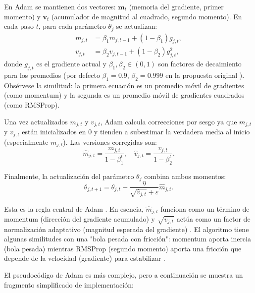 \documentclass[12pt, spanish]{article}
\begin{document}
En Adam se mantienen dos vectores: $\mathbf{m}_t$ (memoria del gradiente, primer momento) y $\mathbf{v}_t$ (acumulador de magnitud al cuadrado, segundo momento). En cada paso $t$, para cada parámetro $\theta_j$ se actualizan:
\begin{align*}
m_{j,t} &= \beta_1 m_{j,t-1} + (1 - \beta_1) g_{j,t}, \\
v_{j,t} &= \beta_2 v_{j,t-1} + (1 - \beta_2) g_{j,t}^2,
\end{align*}
donde $g_{j,t}$ es el gradiente actual y $\beta_1, \beta_2 \in (0,1)$ son factores de decaimiento para los promedios (por defecto $\beta_1 = 0.9$, $\beta_2 = 0.999$ en la propuesta original \cite{ref2}). Obsérvese la similitud: la primera ecuación es un promedio móvil de gradientes (como momentum) y la segunda es un promedio móvil de gradientes cuadrados (como RMSProp).

Una vez actualizados $m_{j,t}$ y $v_{j,t}$, Adam calcula correcciones por sesgo ya que $m_{j,t}$ y $v_{j,t}$ están inicializados en 0 y tienden a subestimar la verdadera media al inicio (especialmente $m_{j,t}$). Las versiones corregidas son:
\[
\hat{m}_{j,t} = \frac{m_{j,t}}{1 - \beta_1^t}, \quad \hat{v}_{j,t} = \frac{v_{j,t}}{1 - \beta_2^t}.
\]

Finalmente, la actualización del parámetro $\theta_j$ combina ambos momentos:
\[
\theta_{j,t+1} = \theta_{j,t} - \frac{\eta}{\sqrt{\hat{v}_{j,t}} + \varepsilon} \hat{m}_{j,t}.
\]

Esta es la regla central de Adam \cite{ref2}. En esencia, $\hat{m}_{j,t}$ funciona como un término de momentum (dirección del gradiente acumulado) y $\sqrt{\hat{v}_{j,t}}$ actúa como un factor de normalización adaptativo (magnitud esperada del gradiente) \cite{ref2}. El algoritmo tiene algunas similitudes con una "bola pesada con fricción": momentum aporta inercia (bola pesada) mientras RMSProp (segundo momento) aporta una fricción que depende de la velocidad (gradiente) para estabilizar \cite{ref2}.

El pseudocódigo de Adam es más complejo, pero a continuación se muestra un fragmento simplificado de implementación:
\end{document}
